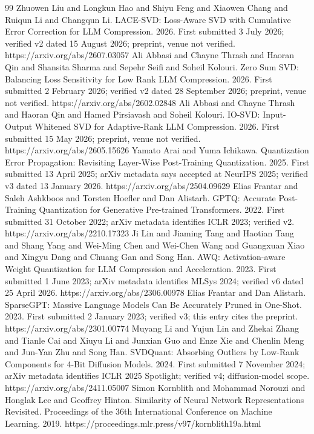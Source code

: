 \documentclass[10pt]{article}
\begin{document}
\begin{thebibliography}{99}
 Zhuowen Liu and Longkun Hao and Shiyu Feng and Xiaowen Chang and Ruiqun Li and Changqun Li. LACE-SVD: Loss-Aware SVD with Cumulative Error Correction for LLM Compression. 2026. First submitted 3 July 2026; verified v2 dated 15 August 2026; preprint, venue not verified. https://arxiv.org/abs/2607.03057
 Ali Abbasi and Chayne Thrash and Haoran Qin and Shansita Sharma and Sepehr Seifi and Soheil Kolouri. Zero Sum SVD: Balancing Loss Sensitivity for Low Rank LLM Compression. 2026. First submitted 2 February 2026; verified v2 dated 28 September 2026; preprint, venue not verified. https://arxiv.org/abs/2602.02848
 Ali Abbasi and Chayne Thrash and Haoran Qin and Hamed Pirsiavash and Soheil Kolouri. IO-SVD: Input-Output Whitened SVD for Adaptive-Rank LLM Compression. 2026. First submitted 15 May 2026; preprint, venue not verified. https://arxiv.org/abs/2605.15626
 Yamato Arai and Yuma Ichikawa. Quantization Error Propagation: Revisiting Layer-Wise Post-Training Quantization. 2025. First submitted 13 April 2025; arXiv metadata says accepted at NeurIPS 2025; verified v3 dated 13 January 2026. https://arxiv.org/abs/2504.09629
 Elias Frantar and Saleh Ashkboos and Torsten Hoefler and Dan Alistarh. GPTQ: Accurate Post-Training Quantization for Generative Pre-trained Transformers. 2022. First submitted 31 October 2022; arXiv metadata identifies ICLR 2023; verified v2. https://arxiv.org/abs/2210.17323
 Ji Lin and Jiaming Tang and Haotian Tang and Shang Yang and Wei-Ming Chen and Wei-Chen Wang and Guangxuan Xiao and Xingyu Dang and Chuang Gan and Song Han. AWQ: Activation-aware Weight Quantization for LLM Compression and Acceleration. 2023. First submitted 1 June 2023; arXiv metadata identifies MLSys 2024; verified v6 dated 25 April 2026. https://arxiv.org/abs/2306.00978
 Elias Frantar and Dan Alistarh. SparseGPT: Massive Language Models Can Be Accurately Pruned in One-Shot. 2023. First submitted 2 January 2023; verified v3; this entry cites the preprint. https://arxiv.org/abs/2301.00774
 Muyang Li and Yujun Lin and Zhekai Zhang and Tianle Cai and Xiuyu Li and Junxian Guo and Enze Xie and Chenlin Meng and Jun-Yan Zhu and Song Han. SVDQuant: Absorbing Outliers by Low-Rank Components for 4-Bit Diffusion Models. 2024. First submitted 7 November 2024; arXiv metadata identifies ICLR 2025 Spotlight; verified v4; diffusion-model scope. https://arxiv.org/abs/2411.05007
 Simon Kornblith and Mohammad Norouzi and Honglak Lee and Geoffrey Hinton. Similarity of Neural Network Representations Revisited. Proceedings of the 36th International Conference on Machine Learning. 2019. https://proceedings.mlr.press/v97/kornblith19a.html

\end{thebibliography}
\end{document}
